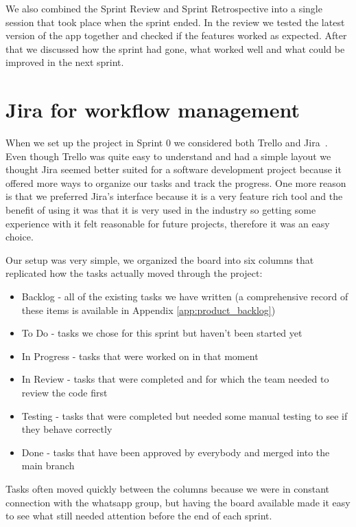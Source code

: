 We also combined the Sprint Review and Sprint Retrospective into a single session that took place when the sprint ended. In the review we tested the latest version of the app together and checked if the features worked as expected. After that we discussed how the sprint had gone, what worked well and what could be improved in the next sprint.

\section{Jira for workflow management}

When we set up the project in Sprint 0 we considered both Trello and Jira~\cite{jira}. Even though Trello was quite easy to understand and had a simple layout we thought Jira seemed better suited for a software development project because it offered more ways to organize our tasks and track the progress. One more reason is that we preferred Jira's interface because it is a very feature rich tool and the benefit of using it was that it is very used in the industry so getting some experience with it felt reasonable for future projects, therefore it was an easy choice.

Our setup was very simple, we organized the board into six columns that replicated how the tasks actually moved through the project:

\begin{itemize}
    \item Backlog - all of the existing tasks we have written (a comprehensive record of these items is available in Appendix \ref{app:product_backlog})
    \item To Do - tasks we chose for this sprint but haven't been started yet
    \item In Progress - tasks that were worked on in that moment
    \item In Review - tasks that were completed and for which the team needed to review the code first
    \item Testing - tasks that were completed but needed some manual testing to see if they behave correctly
    \item Done - tasks that have been approved by everybody and merged into the main branch~\cite{git}
\end{itemize}

Tasks often moved quickly between the columns because we were in constant connection with the whatsapp group, but having the board available made it easy to see what still needed attention before the end of each sprint.


